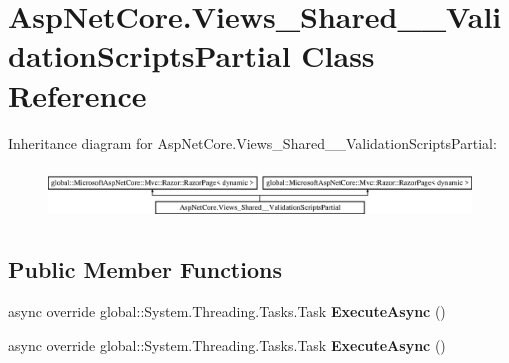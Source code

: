 \hypertarget{class_asp_net_core_1_1_views___shared_____validation_scripts_partial}{}\section{Asp\+Net\+Core.\+Views\+\_\+\+Shared\+\_\+\+\_\+\+Validation\+Scripts\+Partial Class Reference}
\label{class_asp_net_core_1_1_views___shared_____validation_scripts_partial}
Inheritance diagram for Asp\+Net\+Core.\+Views\+\_\+\+Shared\+\_\+\+\_\+\+Validation\+Scripts\+Partial\+:\begin{figure}[H]
\begin{center}
\leavevmode
\includegraphics[height=1.432225cm]{class_asp_net_core_1_1_views___shared_____validation_scripts_partial}
\end{center}
\end{figure}
\subsection*{Public Member Functions}
\begin{DoxyCompactItemize}
\item 
\mbox{\label{class_asp_net_core_1_1_views___shared_____validation_scripts_partial_aca45bee43cd2ddef240d2b1f1f2385c9}} 
async override global\+::\+System.\+Threading.\+Tasks.\+Task {\bfseries Execute\+Async} ()
\item 
\mbox{\label{class_asp_net_core_1_1_views___shared_____validation_scripts_partial_aca45bee43cd2ddef240d2b1f1f2385c9}} 
async override global\+::\+System.\+Threading.\+Tasks.\+Task {\bfseries Execute\+Async} ()
\end{DoxyCompactItemize}
